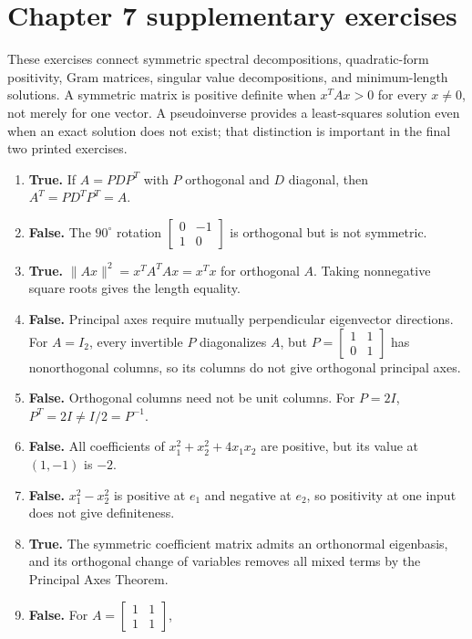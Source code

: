 \section{Chapter 7 supplementary exercises}
These exercises connect symmetric spectral decompositions, quadratic-form
positivity, Gram matrices, singular value decompositions, and minimum-length
solutions. A symmetric matrix is positive definite when $x^TAx>0$ for every
$x\ne0$, not merely for one vector. A pseudoinverse provides a
least-squares solution even when an exact solution does not exist; that
distinction is important in the final two printed exercises.

\begin{enumerate}[label=(\alph*)]
\item \textbf{True.} If $A=PDP^T$ with $P$ orthogonal and $D$
diagonal, then $A^T=PD^TP^T=A$.
\item \textbf{False.} The $90^\circ$ rotation
$\begin{bmatrix}0&-1\\1&0\end{bmatrix}$ is orthogonal but is not symmetric.
\item \textbf{True.} $\|Ax\|^2=x^TA^TAx=x^Tx$ for orthogonal $A$.
Taking nonnegative square roots gives the length equality.
\item \textbf{False.} Principal axes require mutually perpendicular
eigenvector directions. For $A=I_2$, every invertible $P$ diagonalizes $A$,
but $P=\begin{bmatrix}1&1\\0&1\end{bmatrix}$ has nonorthogonal columns,
so its columns do not give orthogonal principal axes.
\item \textbf{False.} Orthogonal columns need not be unit columns.
For $P=2I$, $P^T=2I\ne I/2=P^{-1}$.
\item \textbf{False.} All coefficients of $x_1^2+x_2^2+4x_1x_2$
are positive, but its value at $(1,-1)$ is $-2$.
\item \textbf{False.} $x_1^2-x_2^2$ is positive at $e_1$ and
negative at $e_2$, so positivity at one input does not give definiteness.
\item \textbf{True.} The symmetric coefficient matrix admits an
orthonormal eigenbasis, and its orthogonal change of variables removes
all mixed terms by the Principal Axes Theorem.
\item \textbf{False.} For $A=\begin{bmatrix}1&1\\1&1\end{bmatrix}$,

\end{enumerate}
